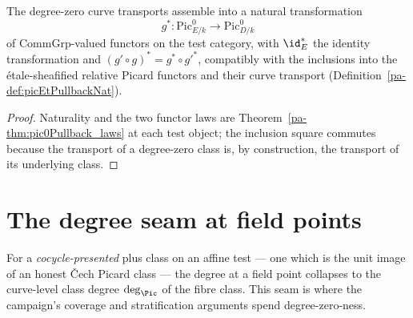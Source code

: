 \begin{definition}
  \label{pa-def:pic0PullbackNat}
  \leanok

  The degree-zero curve transports assemble into a natural transformation
  \[
    g^{*} \colon \mathrm{Pic}^0_{E/k} \longrightarrow \mathrm{Pic}^0_{D/k}
  \]
  of \(\mathrm{CommGrp}\)-valued functors on the test category, with \(\id_E^{*}\) the
  identity transformation and \((g' \circ g)^{*} = g^{*} \circ g'^{*}\), compatibly
  with the inclusions into the \'etale-sheafified relative Picard functors and their
  curve transport (Definition~\ref{pa-def:picEtPullbackNat}).
\end{definition}
\begin{proof}
  \leanok
  Naturality and the two functor laws are Theorem~\ref{pa-thm:pic0Pullback_laws} at each
  test object; the inclusion square commutes because the transport of a degree-zero
  class is, by construction, the transport of its underlying class.
\end{proof}

\section{The degree seam at field points}
\label{pa-sec:degreeSeam}

For a \emph{cocycle-presented} plus class on an affine test — one which is the unit image of
an honest \v Cech Picard class — the degree at a field point collapses to the curve-level
class degree \(\deg_{\Pic}\) of the fibre class. This seam is where the campaign's coverage
and stratification arguments spend degree-zero-ness.

